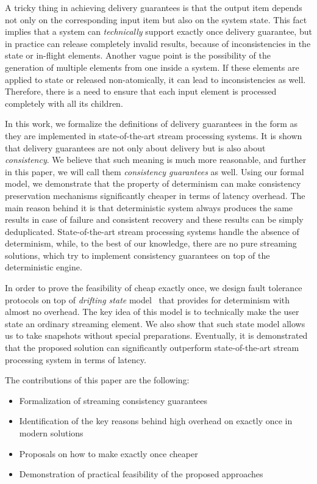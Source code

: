 A tricky thing in achieving delivery guarantees is that the output item depends not only on the corresponding input item but also on the system state. This fact implies that a system can {\em technically} support exactly once delivery guarantee, but in practice can release completely invalid results, because of inconsistencies in the state or in-flight elements. Another vague point is the possibility of the generation of multiple elements from one inside a system. If these elements are applied to state or released non-atomically, it can lead to inconsistencies as well. Therefore, there is a need to ensure that each input element is processed completely with all its children. 

In this work, we formalize the definitions of delivery guarantees in the form as they are implemented in state-of-the-art stream processing systems. It is shown that delivery guarantees are not only about delivery but is also about {\em consistency}. We believe that such meaning is much more reasonable, and further in this paper, we will call them {\em consistency guarantees} as well. Using our formal model, we demonstrate that the property of determinism can make consistency preservation mechanisms significantly cheaper in terms of latency overhead. The main reason behind it is that deterministic system always produces the same results in case of failure and consistent recovery and these results can be simply deduplicated. State-of-the-art stream processing systems handle the absence of determinism, while, to the best of our knowledge, there are no pure streaming solutions, which try to implement consistency guarantees on top of the deterministic engine.

In order to prove the feasibility of cheap exactly once, we design fault tolerance protocols on top of {\em drifting state} model~\cite{we2018adbis} that provides for determinism with almost no overhead. The key idea of this model is to technically make the user state an ordinary streaming element. We also show that such state model allows us to take snapshots without special preparations. Eventually, it is demonstrated that the proposed solution can significantly outperform state-of-the-art stream processing system in terms of latency.

The contributions of this paper are the following: 
\begin{itemize}
    \item Formalization of streaming consistency guarantees 
    \item Identification of the key reasons behind high overhead on exactly once in modern solutions 
    \item Proposals on how to make exactly once cheaper
    \item Demonstration of practical feasibility of the proposed approaches
\end{itemize}

